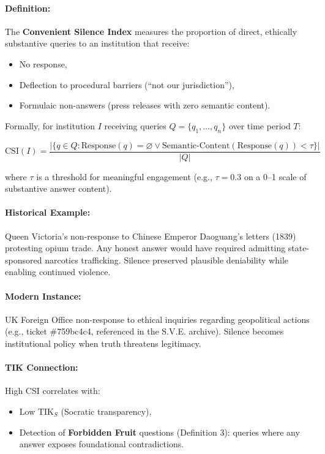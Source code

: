 \documentclass[11pt,a4paper]{article}
\theoremstyle{definition}
\theoremstyle{remark}
\begin{document}
\paragraph{Definition:}
The \textbf{Convenient Silence Index} measures the proportion of direct, ethically substantive queries to an institution that receive:
\begin{itemize}
\item No response,
\item Deflection to procedural barriers (``not our jurisdiction''),
\item Formulaic non-answers (press releases with zero semantic content).
\end{itemize}

Formally, for institution $I$ receiving queries $Q = \{q_1, \dots, q_n\}$ over time period $T$:

\[
\text{CSI}(I) = \frac{|\{q \in Q : \text{Response}(q) = \varnothing \lor \text{Semantic-Content}(\text{Response}(q)) < \tau\}|}{|Q|}
\]

where $\tau$ is a threshold for meaningful engagement (e.g., $\tau = 0.3$ on a 0–1 scale of substantive answer content).

\paragraph{Historical Example:}
Queen Victoria's non-response to Chinese Emperor Daoguang's letters (1839) protesting opium trade. Any honest answer would have required admitting state-sponsored narcotics trafficking. Silence preserved plausible deniability while enabling continued violence.

\paragraph{Modern Instance:}
UK Foreign Office non-response to ethical inquiries regarding geopolitical actions (e.g., ticket \#759bc4c4, referenced in the S.V.E. archive). Silence becomes institutional policy when truth threatens legitimacy.

\paragraph{TIK Connection:}
High CSI correlates with:
\begin{itemize}
\item Low $\text{TIK}_S$ (Socratic transparency),
\item Detection of \textbf{Forbidden Fruit} questions (Definition 3): queries where any answer exposes foundational contradictions.
\end{itemize}
\end{document}
